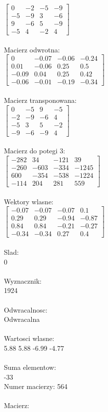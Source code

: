 \documentclass[a4paper,12pt]{article}
\begin{document}
$\begin{bmatrix} 0&-2&-5&-9\\-5&-9&3&-6\\9&-6&5&-9\\-5&4&-2&4 \end{bmatrix}$
\\
\\
Macierz odwrotna:\\

$\begin{bmatrix} 0&-0.07&-0.06&-0.24\\0.01&-0.06&0.25&0.5\\-0.09&0.04&0.25&0.42\\-0.06&-0.01&-0.19&-0.34 \end{bmatrix}$
\\
\\
Macierz transponowana:\\

$\begin{bmatrix} 0&-5&9&-5\\-2&-9&-6&4\\-5&3&5&-2\\-9&-6&-9&4 \end{bmatrix}$
\\
\\
Macierz do potegi 3:\\

$\begin{bmatrix} -282&34&-121&39\\-260&-603&-334&-1245\\600&-354&-538&-1224\\-114&204&281&559 \end{bmatrix}$
\\
\\
Wektory wlasne:\\

$\begin{bmatrix} -0.07&-0.07&-0.07&0.1\\0.29&0.29&-0.94&-0.87\\0.84&0.84&-0.21&-0.27\\-0.34&-0.34&0.27&0.4 \end{bmatrix}$
\\
\\
Slad:\\
0
\\
\\
Wyznacznik:\\
1924
\\
\\
Odwracalnosc:\\
Odwracalna
\\
\\
Wartosci wlasne:\\
5.88 5.88 -6.99 -4.77
\\
\\
Suma elementow:\\
-33
\\
\newpage
Numer macierzy:
564
\\
\\
Macierz:\\
\end{document}
